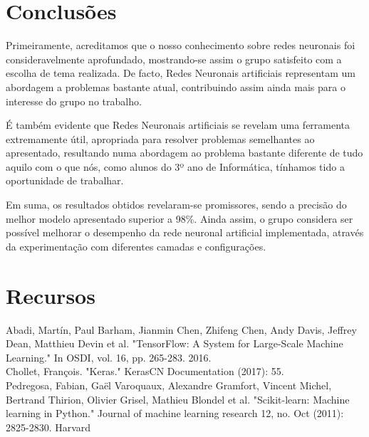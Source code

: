 \documentclass[]{article}
\begin{document}

\section{Conclusões}
	Primeiramente, acreditamos que o nosso conhecimento sobre redes neuronais foi consideravelmente aprofundado, mostrando-se assim o grupo satisfeito com a escolha de tema realizada. De facto, Redes Neuronais artificiais representam um abordagem a problemas bastante atual, contribuindo assim ainda mais para o interesse do grupo no trabalho.   
    
    É também evidente que Redes Neuronais artificiais se revelam uma ferramenta extremamente útil, apropriada para resolver problemas semelhantes ao apresentado, resultando numa abordagem ao problema bastante diferente de tudo aquilo com o que nós, como alunos do 3º ano de Informática, tínhamos tido a oportunidade de trabalhar.
    
    Em suma, os resultados obtidos revelaram-se promissores, sendo a precisão do melhor modelo apresentado superior a 98\%. Ainda assim, o grupo considera ser possível melhorar o desempenho da rede neuronal artificial implementada, através da experimentação com diferentes camadas e configurações.
    
\newpage


\section{Recursos}

Abadi, Martín, Paul Barham, Jianmin Chen, Zhifeng Chen, Andy Davis, Jeffrey Dean, Matthieu Devin et al. "TensorFlow: A System for Large-Scale Machine Learning." In OSDI, vol. 16, pp. 265-283. 2016.
\\

Chollet, François. "Keras." KerasCN Documentation (2017): 55.
\\

Pedregosa, Fabian, Gaël Varoquaux, Alexandre Gramfort, Vincent Michel, Bertrand Thirion, Olivier Grisel, Mathieu Blondel et al. "Scikit-learn: Machine learning in Python." Journal of machine learning research 12, no. Oct (2011): 2825-2830.
Harvard	
\\
\end{document}
